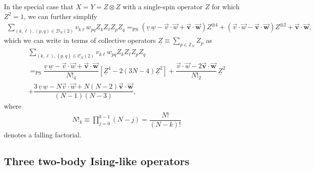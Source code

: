 \documentclass[nofootinbib,notitlepage,11pt]{revtex4-2}
\newcommand{\f}[2]{\dfrac{#1}{#2}} %
\newcommand{\p}[1]{\left(#1\right)} %
\renewcommand{\sp}[1]{\left[#1\right]} %
\renewcommand{\set}[1]{\left\{#1\right\}} %
\renewcommand{\c}{\cdot} %
\newcommand{\m}{\bm} %
\renewcommand{\v}{\vec} %
\newcommand{\1}{\mathds{1}}
\newcommand{\C}{\mathcal{C}}
\newcommand{\D}{\mathcal{D}}
\newcommand{\ZZ}{\mathbb{Z}}
\newcommand{\EQPS}{=_{\text{PS}}}
\newcommand{\col}{\underline}
\begin{document}
In the special case that $X=Y=Z\otimes Z$ with a single-spin operator
$Z$ for which $Z^2=1$, we can further simplify
\begin{align}
  \sum_{\p{k,\ell},\p{p,q}\in\D_N\p{2}} v_{k\ell} w_{pq}
  Z_k Z_\ell Z_p Z_q
  \EQPS \p{\col{v}\,\col{w} - \v v\c\v w + \v{\m v}\c\v{\m w}}
  Z^{\otimes 4}
  + \p{\v v\c\v w - \v{\m v} \c \v{\m w}} Z^{\otimes 2}
  + \v{\m v}\c\v{\m w},
\end{align}
which we can write in terms of collective operators
$\col{Z}\equiv\sum_{p\in\ZZ_N}Z_p$ as
\begin{multline}
  \sum_{\p{k,\ell},\set{p,q}\in\C_N\p{2}} v_{k\ell} w_{pq}
  Z_k Z_\ell Z_p Z_q \\
  \EQPS \f{\col{v}\,\col{w} - \v v\c\v w + \v{\m v}\c\v{\m w}}{N!_4}
  \sp{\col{Z}^4 - 2\p{3N-4} \col{Z}^2}
  + \f{\v v\c\v w - 2 \v{\m v} \c \v{\m w}}{N!_2}\, \col{Z}^2 \\
  + \f{3\,\col{v}\,\col{w} - N \v v\c\v w + N\p{N-2}\v{\m v}\c\v{\m
      w}}{\p{N-1}\p{N-3}},
\end{multline}
where
\begin{align}
  N!_k \equiv \prod_{j=0}^{k-1} \p{N-j} = \f{N!}{\p{N-k}!}
\end{align}
denotes a falling factorial.

\subsection{Three two-body Ising-like operators}
\end{document}
